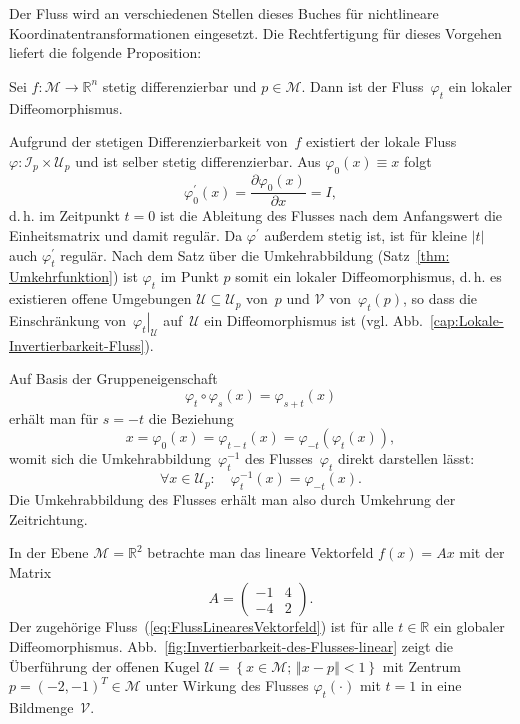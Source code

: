Der Fluss wird an verschiedenen Stellen dieses Buches für nichtlineare
Koordinatentransformationen eingesetzt. Die Rechtfertigung für dieses
Vorgehen liefert die folgende Proposition:
\begin{proposition}
\label{pro:Lokale-Invertierbarkeit-Fluss}Sei
$f:\mathcal{M}\to{\mathbb{R}}^{n}$ stetig differenzierbar und $p\in\mathcal{M}$.
Dann ist der Fluss~$\varphi_{t}$ ein lokaler Diffeomorphismus.
\end{proposition}
\begin{svmultproof}
Aufgrund der stetigen Differenzierbarkeit von~$f$ existiert der
lokale Fluss $\varphi:\mathcal{I}_{p}\times\mathcal{U}_{p}$ und ist
selber stetig differenzierbar. Aus $\varphi_{0}(x)\equiv x$ folgt
\[
\varphi_{0}^{\prime}(x)=\frac{\partial\varphi_{0}(x)}{\partial x}=I,
\]
d.\,h. im Zeitpunkt $t=0$ ist die Ableitung des Flusses nach dem
Anfangswert die Einheitsmatrix und damit regulär. Da $\varphi^{\prime}$
außerdem stetig ist, ist für kleine $|t|$ auch $\varphi_{t}^{\prime}$
regulär. Nach dem Satz über die Umkehrabbildung (Satz~\ref{thm: Umkehrfunktion})
ist $\varphi_{t}$ im Punkt $p$ somit ein lokaler Diffeomorphismus,
d.\,h. es existieren offene Umgebungen $\mathcal{U}\subseteq\mathcal{U}_{p}$
von~$p$ und $\mathcal{V}$ von~$\varphi_{t}(p)$, so dass die Einschränkung
von~$\left.\varphi_{t}\right|_{\mathcal{U}}$ auf~$\mathcal{U}$
ein Diffeomorphismus ist (vgl. Abb.~\ref{cap:Lokale-Invertierbarkeit-Fluss}).
\end{svmultproof}



Auf Basis der Gruppeneigenschaft
\begin{equation}
\varphi_{t}\circ\varphi_{s}(x)=\varphi_{s+t}(x)\label{eq:Gruppeneigenschaft2}
\end{equation}
erhält man für $s=-t$ die Beziehung
\[
x=\varphi_{0}(x)=\varphi_{t-t}(x)=\varphi_{-t}(\varphi_{t}(x)),
\]
womit sich die Umkehrabbildung~$\varphi_{t}^{-1}$ des Flusses~$\varphi_{t}$
direkt darstellen lässt:
\begin{equation}
\forall x\in\mathcal{U}_{p}:\quad\varphi_{t}^{-1}(x)=\varphi_{-t}(x).\label{eq:InversionFluss}
\end{equation}
Die Umkehrabbildung des Flusses erhält man also durch Umkehrung der
Zeit\-richtung.

\begin{example}
\label{exa:invertierbarkeit-fluss-lin-dgl}In der Ebene $\mathcal{M}={\mathbb{R}}^{2}$
betrachte man das lineare Vektorfeld $f(x)=Ax$ mit der Matrix
\[
A=\left(\begin{array}{rr}
-1 & 4\\
-4 & 2
\end{array}\right).
\]
Der zugehörige Fluss~(\ref{eq:FlussLinearesVektorfeld}) ist für
alle $t\in{\mathbb{R}}$ ein globaler Diffeomorphismus. Abb.~\ref{fig:Invertierbarkeit-des-Flusses-linear}
zeigt die Überführung der offenen Kugel $\mathcal{U}=\left\{ x\in\mathcal{M};\,\left\Vert x-p\right\Vert <1\right\} $
mit Zentrum $p=(-2,-1)^{T}\in\mathcal{M}$ unter Wirkung des Flusses
$\varphi_{t}(\cdot)$ mit $t=1$ in eine Bildmenge~$\mathcal{V}$.
\end{example}


